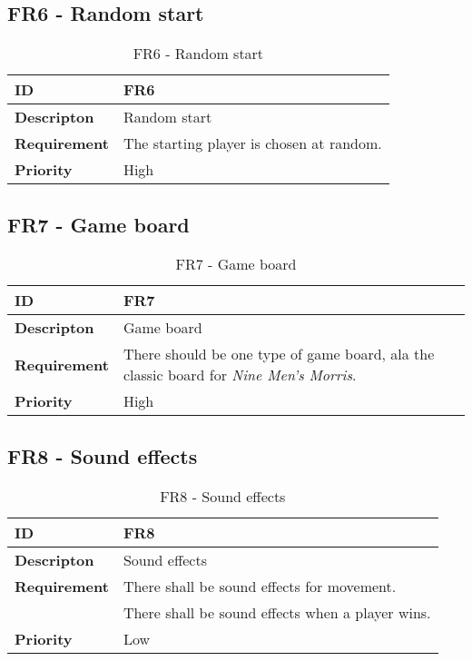 \subsection{FR6 - Random start}

\begin{table}[h!]
\begin{tabular}{ | p{90pt} | p{270pt}  |}
\hline
\bf ID &  FR6  \\ \hline
\bf Descripton & Random start \\ \hline 
\bf Requirement & The starting player is chosen at random. \\ \hline
\bf Priority & High \\ \hline

\end{tabular}
\caption{FR6 - Random start}
\end{table}

\subsection{FR7 - Game board}

\begin{table}[h!]
\begin{tabular}{ | p{90pt} | p{270pt}  |}
\hline
\bf ID &  FR7  \\ \hline
\bf Descripton & Game board \\ \hline 
\bf Requirement & There should be one type of game board, ala the classic board for \emph{Nine Men's Morris}.\\ \hline
\bf Priority & High \\ \hline

\end{tabular}
\caption{FR7 - Game board}
\end{table}

\subsection{FR8 - Sound effects}

\begin{table}[h!]
\begin{tabular}{ | p{90pt} | p{270pt}  |}
\hline
\bf ID &  FR8  \\ \hline
\bf Descripton & Sound effects \\ \hline 
\bf Requirement & There shall be sound effects for movement. \\
& There shall be sound effects when a player wins. \\ \hline
\bf Priority & Low \\ \hline

\end{tabular}
\caption{FR8 - Sound effects}
\end{table}

